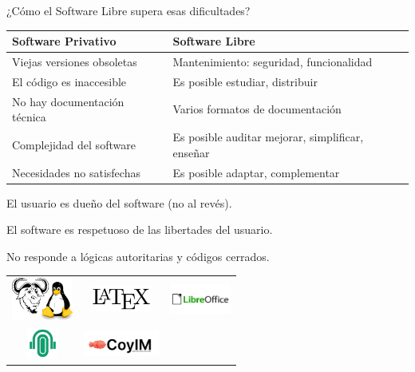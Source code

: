 \documentclass[spanish]{beamer}
\begin{document}
\begin{frame}{¿Cómo el Software Libre supera esas dificultades?}
    \centering
    \resizebox{12cm}{!}
    {
    \begin{tabular}{|l|l|}
        \hline        
        \rowcolor{lightgray}\textbf{Software Privativo} & \textbf{Software Libre}\\ 
        \hline
        \hline
        Viejas versiones obsoletas & Mantenimiento: seguridad, funcionalidad \\ 
        \hline
        El código es inaccesible & Es posible estudiar, distribuir \\
        \hline
        No hay documentación técnica & Varios formatos de documentación \\
        \hline
        Complejidad del software & Es posible auditar \MVRightArrow{} mejorar, simplificar, enseñar \\
        \hline
        Necesidades no satisfechas & Es posible adaptar, complementar \\
        \hline
    \end{tabular}
    }
    
    \vspace{0.3cm}
    El usuario es dueño del software (no al revés). 
    
    El software es respetuoso de las libertades del usuario.

    No responde a lógicas autoritarias y códigos cerrados.
    
    \vspace{0.4cm}

    
    \begin{tabular}{ccc}        
        \includegraphics[width=2cm]{img/GNU_and_Tux.jpg} & \includegraphics[width=2cm]{img/latex.jpg} & \includegraphics[width=2cm]{img/libreoffice.png} \\        
        \includegraphics[width=1cm]{img/wahay.jpg} & \includegraphics[width=2.5cm]{img/coyim.jpg} \\
    \end{tabular}

\end{frame}
\end{document}
